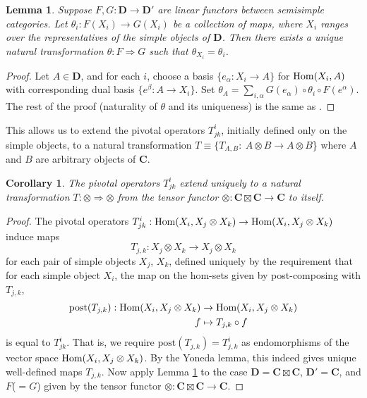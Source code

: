 \documentclass[a4paper]{article}
\theoremstyle{plain}
\newtheorem{cor}[thm]{Corollary}
\newtheorem{lem}[thm]{Lemma}
\theoremstyle{definition}
\newcommand{\Hom}{\operatorname{\text{\rm Hom}}}
\newcommand{\cat}{\mathbf}
\begin{document}
\begin{lem} \label{extend}Suppose $F,G : \cat{D} \rightarrow \cat{D}'$ are linear functors between semisimple categories. Let $\theta_{i} : F(X_i) \rightarrow G(X_i)$ be a collection of maps, where $X_i$ ranges over the representatives of the simple objects of $\cat{D}$. Then there exists a unique natural transformation $\theta : F \Rightarrow G$ such that $\theta_{X_i} = \theta_i$.
\end{lem}
\begin{proof} Let $A \in \cat{D}$, and for each $i$, choose a basis $\{e_\alpha : X_i \rightarrow A\}$ for $\Hom(X_i, A)$ with corresponding dual basis $\{e^\beta : A \rightarrow X_i\}$. Set  $\theta_A = \sum_{i,\alpha} G(e_\alpha) \circ \theta_i \circ F(e^\alpha)$. The rest of the proof (naturality of $\theta$ and its uniqueness) is the same as \cite[Lemma 3.9]{BBthesis}.
\end{proof}
This allows us to extend the pivotal operators $T^i_{jk}$, initially defined only on the simple objects, to a natural transformation $T \equiv \{T_{A,B} :\ A \otimes B \rightarrow A \otimes B$\} where $A$ and $B$ are arbitrary objects of $\cat{C}$.
\begin{cor} The pivotal operators $T^i_{jk}$ extend uniquely to a natural transformation $T : \otimes \Rightarrow \otimes$ from the tensor functor $\otimes : \cat{C} \boxtimes \cat{C} \rightarrow \cat{C}$ to itself. \label{extend_cor}
\end{cor}
\begin{proof}
The pivotal operators $T^i_{jk} : \Hom(X_i, X_j \otimes X_k) \rightarrow \Hom(X_i, X_j \otimes X_k)$ induce maps
\[
T_{j,k} : X_j \otimes X_k \rightarrow X_j \otimes X_k
\]
for each pair of simple objects $X_j$, $X_k$, defined uniquely by the requirement that for each simple object $X_i$, the map on the hom-sets given by post-composing with $T_{j,k}$,
\begin{align*}
 \text{post}(T_{j,k}) : \Hom(X_i, X_j \otimes X_k) & \rightarrow \Hom(X_i, X_j \otimes X_k)  \\
 f & \mapsto T_{j,k} \circ f
\end{align*}
is equal to $T^i_{jk}$. That is, we require $\text{post}(T_{j,k}) = T^i_{j,k}$ as endomorphisms of the vector space $\Hom(X_i, X_j \otimes X_k)$. By the Yoneda lemma, this indeed gives unique well-defined maps $T_{j,k}$. Now apply Lemma \ref{extend} to the case $\cat{D} =\cat{C} \boxtimes \cat{C}$, $\cat{D}' = \cat{C}$, and $F$($=G$) given by the tensor functor $\otimes : \cat{C} \boxtimes \cat{C} \rightarrow \cat{C}$.  
\end{proof}
\end{document}
